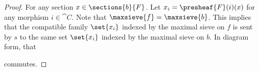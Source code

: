 
\begin{proof}
For any section $x \in \sections{b}{F}$.
Let $x_i = \presheaf{F}(i)(x)$ for any morphism $i \in \cat{C}$. 
Note that $\maxsieve{f} = \maxsieve{b}$.
This implies that the compatible family $\set{x_i}$ indexed by the maximal sieve on $f$
is sent by $s$ to the same set $\set{x_i}$ indexed by the maximal sieve on $b$.
In diagram form, that

\begin{center}
\end{center}

commutes.
\end{proof}
